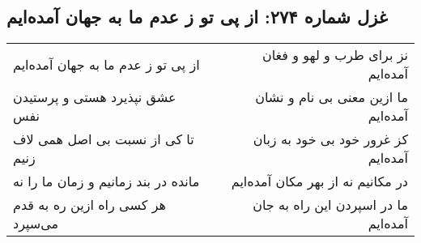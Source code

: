 \begin{center}
\section*{غزل شماره ۲۷۴: از پی تو ز عدم ما به جهان آمده‌ایم}
\label{sec:274}
\begin{longtable}{l p{0.5cm} r}
از پی تو ز عدم ما به جهان آمده‌ایم
&&
نز برای طرب و لهو و فغان آمده‌ایم
\\
عشق نپذیرد هستی و پرستیدن نفس
&&
ما ازین معنی بی نام و نشان آمده‌ایم
\\
تا کی از نسبت بی اصل همی لاف زنیم
&&
کز غرور خود بی خود به زبان آمده‌ایم
\\
مانده در بند زمانیم و زمان ما را نه
&&
در مکانیم نه از بهر مکان آمده‌ایم
\\
هر کسی راه ازین ره به قدم می‌سپرد
&&
ما در اسپردن این راه به جان آمده‌ایم
\\
\end{longtable}
\end{center}

